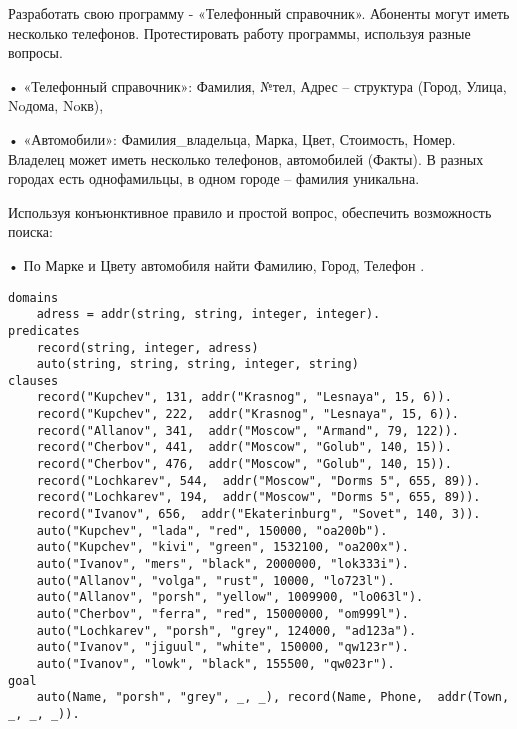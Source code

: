\documentclass[a4paper,14pt, unknownkeysallowed]{extreport}
\begin{document}


Разработать свою программу - «Телефонный справочник». Абоненты могут иметь
несколько телефонов. Протестировать работу программы, используя разные вопросы.

• «Телефонный справочник»: Фамилия, №тел, Адрес – структура (Город, Улица, Noдома,
Noкв),

• «Автомобили»: Фамилия\_владельца, Марка, Цвет, Стоимость, Номер.
Владелец может иметь несколько телефонов, автомобилей (Факты). В разных городах
есть однофамильцы, в одном городе – фамилия уникальна.

Используя конъюнктивное правило и простой вопрос, обеспечить возможность
поиска:

• По Марке и Цвету автомобиля найти Фамилию, Город, Телефон .

\begin{lstlisting}
domains
	adress = addr(string, string, integer, integer).
predicates
	record(string, integer, adress)
	auto(string, string, string, integer, string)
clauses
	record("Kupchev", 131, addr("Krasnog", "Lesnaya", 15, 6)).
	record("Kupchev", 222,  addr("Krasnog", "Lesnaya", 15, 6)).
	record("Allanov", 341,  addr("Moscow", "Armand", 79, 122)).
	record("Cherbov", 441,  addr("Moscow", "Golub", 140, 15)).
	record("Cherbov", 476,  addr("Moscow", "Golub", 140, 15)).
	record("Lochkarev", 544,  addr("Moscow", "Dorms 5", 655, 89)).
	record("Lochkarev", 194,  addr("Moscow", "Dorms 5", 655, 89)).
	record("Ivanov", 656,  addr("Ekaterinburg", "Sovet", 140, 3)).
	auto("Kupchev", "lada", "red", 150000, "oa200b").
	auto("Kupchev", "kivi", "green", 1532100, "oa200x").
	auto("Ivanov", "mers", "black", 2000000, "lok333i").
	auto("Allanov", "volga", "rust", 10000, "lo723l").
	auto("Allanov", "porsh", "yellow", 1009900, "lo063l").
	auto("Cherbov", "ferra", "red", 15000000, "om999l").
	auto("Lochkarev", "porsh", "grey", 124000, "ad123a").
	auto("Ivanov", "jiguul", "white", 150000, "qw123r").
	auto("Ivanov", "lowk", "black", 155500, "qw023r").
goal	
	auto(Name, "porsh", "grey", _, _), record(Name, Phone,  addr(Town, _, _, _)).
	
\end{lstlisting}
\end{document}
